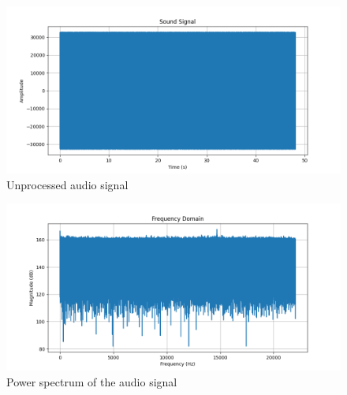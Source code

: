 \documentclass[a4paper,12pt,fleqn]{article}
\begin{document}
\begin{figure}[H]
    \centering
    \includegraphics[width=1\textwidth]{ex3_raw.png}
    \caption{Unprocessed audio signal}
    \label{fig:ex3}
\end{figure}
\begin{figure}[H]
    \centering
    \includegraphics[width=1\textwidth]{ex3_frequency_domain.png}
    \caption{Power spectrum of the audio signal}
    \label{fig:ex3_freq}

\end{figure}
\end{document}
